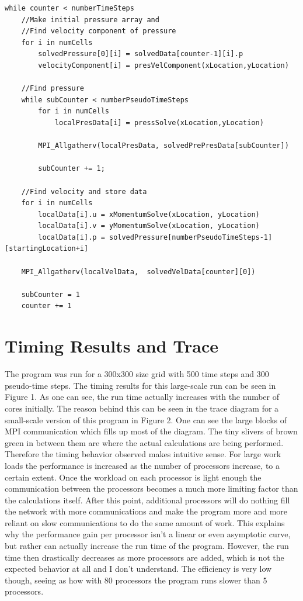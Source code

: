 \documentclass[12pt]{article}
\begin{document}
\begin{lstlisting}
while counter < numberTimeSteps
	//Make initial pressure array and 
	//Find velocity component of pressure
	for i in numCells
		solvedPressure[0][i] = solvedData[counter-1][i].p
		velocityComponent[i] = presVelComponent(xLocation,yLocation)
	
	//Find pressure
	while subCounter < numberPseudoTimeSteps
		for i in numCells
			localPresData[i] = pressSolve(xLocation,yLocation)

		MPI_Allgatherv(localPresData, solvedPrePresData[subCounter])

		subCounter += 1;

	//Find velocity and store data
	for i in numCells
		localData[i].u = xMomentumSolve(xLocation, yLocation)
		localData[i].v = yMomentumSolve(xLocation, yLocation)
		localData[i].p = solvedPressure[numberPseudoTimeSteps-1][startingLocation+i]

	MPI_Allgatherv(localVelData,  solvedVelData[counter][0])

	subCounter = 1
	counter += 1
\end{lstlisting}

\section{Timing Results and Trace}
The program was run for a 300x300 size grid with 500 time steps and 300 pseudo-time steps. The timing results for this 
large-scale run can be seen in Figure 1. As one can see, the run time actually increases with the number of 
cores initially. The reason behind this can be seen in the trace diagram for a small-scale version of this program in 
Figure 2. One can 
see the large blocks of MPI communication which fills up most of the diagram. The tiny slivers of brown green in 
between them are where the actual calculations are being performed. Therefore the timing behavior observed makes 
intuitive sense. For large work loads the performance is increased as the number of processors increase, to a certain 
extent. Once the workload on each processor is light enough the communication between the processors becomes a much 
more limiting factor than the calculations itself. After this point, additional processors will do nothing fill the 
network with more communications and make the program more and more reliant on slow communications to do the same 
amount of work. This explains why the performance gain per processor isn't a linear or even asymptotic curve, but 
rather can actually increase the run time of the program. However, the run time then drastically decreases as 
more processors are added, which is not the expected behavior at all and I don't understand. The efficiency is very 
low though, seeing as how with 80 processors the program runs slower than 5 processors.
\end{document}
